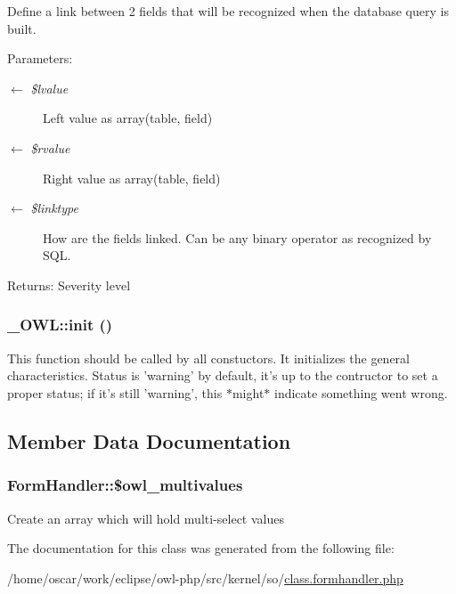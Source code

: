 Define a link between 2 fields that will be recognized when the database query is built.

\begin{Desc}
\item[Parameters:]
\begin{description}
\item[\mbox{$\leftarrow$} {\em \$lvalue}]Left value as array(table, field) \item[\mbox{$\leftarrow$} {\em \$rvalue}]Right value as array(table, field) \item[\mbox{$\leftarrow$} {\em \$linktype}]How are the fields linked. Can be any binary operator as recognized by SQL. \end{description}
\end{Desc}
\begin{Desc}
\item[Returns:]Severity level \end{Desc}
\hypertarget{class__OWL_e0ef3ded56e8a6b34b6461e5a721cd3e}{
\subsubsection{\setlength{\rightskip}{0pt plus 5cm}\_\-OWL::init ()}}
\label{class__OWL_e0ef3ded56e8a6b34b6461e5a721cd3e}


This function should be called by all constuctors. It initializes the general characteristics. Status is 'warning' by default, it's up to the contructor to set a proper status; if it's still 'warning', this $\ast$might$\ast$ indicate something went wrong. 

\subsection{Member Data Documentation}
\hypertarget{classFormHandler_7aa914557e2c76b46e4e0601c5dd75d5}{
\subsubsection{\setlength{\rightskip}{0pt plus 5cm}FormHandler::\$owl\_\-multivalues}}
\label{classFormHandler_7aa914557e2c76b46e4e0601c5dd75d5}


Create an array which will hold multi-select values 

The documentation for this class was generated from the following file:\begin{CompactItemize}
\item 
/home/oscar/work/eclipse/owl-php/src/kernel/so/\hyperlink{class_8formhandler_8php}{class.formhandler.php}\end{CompactItemize}
